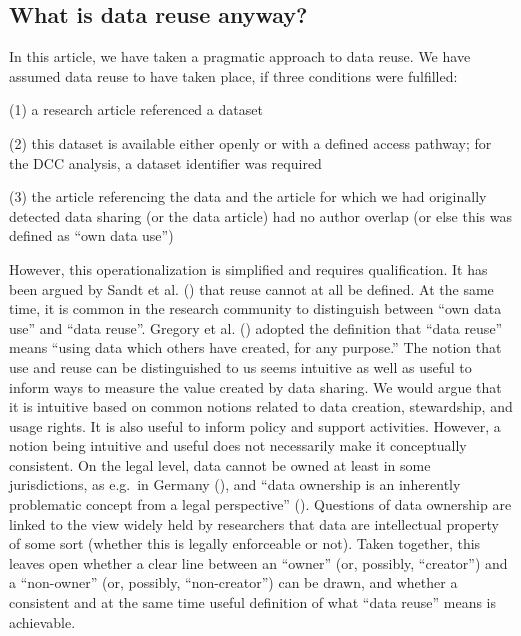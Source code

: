 \documentclass[
  letterpaper,
  DIV=11,
  numbers=noendperiod]{scrartcl}
\begin{document}
\subsection{What is data reuse anyway?}\label{sec-discussion-reuse}

In this article, we have taken a pragmatic approach to data reuse. We
have assumed data reuse to have taken place, if three conditions were
fulfilled:

(1) a research article referenced a dataset

(2) this dataset is available either openly or with a defined access
pathway; for the DCC analysis, a dataset identifier was required

(3) the article referencing the data and the article for which we had
originally detected data sharing (or the data article) had no author
overlap (or else this was defined as ``own data use'')

However, this operationalization is simplified and requires
qualification. It has been argued by Sandt et al.
() that reuse cannot at all be defined. At
the same time, it is common in the research community to distinguish
between ``own data use'' and ``data reuse''. Gregory et al.
() adopted the definition that ``data
reuse'' means ``using data which others have created, for any purpose.''
The notion that use and reuse can be distinguished to us seems intuitive
as well as useful to inform ways to measure the value created by data
sharing. We would argue that it is intuitive based on common notions
related to data creation, stewardship, and usage rights. It is also
useful to inform policy and support activities. However, a notion being
intuitive and useful does not necessarily make it conceptually
consistent. On the legal level, data cannot be owned at least in some
jurisdictions, as e.g.~in Germany (), and
``data ownership is an inherently problematic concept from a legal
perspective''
(). Questions of data
ownership are linked to the view widely held by researchers that data
are intellectual property of some sort (whether this is legally
enforceable or not). Taken together, this leaves open whether a clear
line between an ``owner'' (or, possibly, ``creator'') and a
``non-owner'' (or, possibly, ``non-creator'') can be drawn, and whether
a consistent and at the same time useful definition of what ``data
reuse'' means is achievable.
\end{document}
